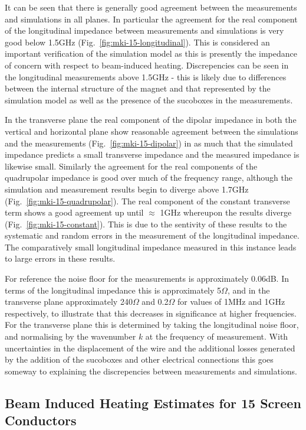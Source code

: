 It can be seen that there is generally good agreement between the measurements and simulations in all planes. In particular the agreement for the real component of the longitudinal impedance between measurements and simulations is very good below 1.5GHz (Fig.~\ref{fig:mki-15-longitudinal}). This is considered an important verification of the simulation model as this is presently the impedance of  concern with respect to beam-induced heating. Discrepencies can be seen in the longitudinal measurements above 1.5GHz - this is likely due to differences between the internal structure of the magnet and that represented by the simulation model as well as the presence of the sucoboxes in the measurements.

In the transverse plane the real component of the dipolar impedance in both the vertical and horizontal plane show reasonable agreement between the simulations and the measurements (Fig.~\ref{fig:mki-15-dipolar}) in as much that the simulated impedance predicts a small transverse impedance and the measured impedance is likewise small. Similarly the agreement for the real components of the quadrupolar impedance is good over much of the frequency range, although the simulation and measurement results begin to diverge above 1.7GHz (Fig.~\ref{fig:mki-15-quadrupolar}). The real component of the constant transverse term shows a good agreement up until $\approx$ 1GHz whereupon the results diverge (Fig.~\ref{fig:mki-15-constant}). This is due to the sentivity of these results to the systematic and random errors in the measurement of the longitudinal impedance. The comparatively small longitudinal impedance measured in this instance leads to large errors in these results. 

For reference the noise floor for the measurements is approximately 0.06dB. In terms of the longitudinal impedance this is approximately 5$\Omega$, and in the transverse plane approximately 240$\Omega$ and 0.2$\Omega$ for values of 1MHz and 1GHz respectively, to illustrate that this decreases in significance at higher frequencies. For the transverse plane this is determined by taking the longitudinal noise floor, and normalising by the wavenumber $k$ at the frequency of measurement. With uncertainties in the displacement of the wire and the additional losses generated by the addition of the sucoboxes and other electrical connections this goes someway to explaining the discrepencies between measurements and simulations. 

\subsection{Beam Induced Heating Estimates for 15 Screen Conductors}

